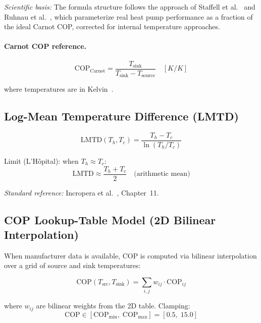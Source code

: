 \documentclass[a4paper,12pt]{article}
\newcommand{\COP}{\mathrm{COP}}
\newcommand{\LMTD}{\mathrm{LMTD}}
\begin{document}
\noindent\textit{Scientific basis:} The formula structure follows the approach of
Staffell et al.~\cite{Staffell2012} and Ruhnau et al.~\cite{Ruhnau2019}, which
parameterize real heat pump performance as a fraction of the ideal Carnot COP,
corrected for internal temperature approaches.

\paragraph{Carnot COP reference.}

\begin{equation}
  \COP_{\text{Carnot}}
  = \frac{T_{\text{sink}}}{T_{\text{sink}} - T_{\text{source}}}
  \quad [K/K]
  \label{eq:cop-carnot}
\end{equation}

where temperatures are in Kelvin~\cite{Cengel2018}.

\subsection{Log-Mean Temperature Difference (LMTD)}

\begin{equation}
  \LMTD(T_h, T_c)
  = \frac{T_h - T_c}{\ln(T_h / T_c)}
  \tag{COP-2}
  \label{eq:lmtd}
\end{equation}

\noindent Limit (L'H\^{o}pital): when $T_h \approx T_c$:
\[
  \LMTD \approx \frac{T_h + T_c}{2} \quad \text{(arithmetic mean)}
\]

\noindent\textit{Standard reference:} Incropera et al.~\cite{Incropera2017}, Chapter~11.

\subsection{COP Lookup-Table Model (2D Bilinear Interpolation)}

When manufacturer data is available, COP is computed via bilinear interpolation over a
grid of source and sink temperatures:

\begin{equation}
  \COP(T_{\text{src}}, T_{\text{sink}})
  = \sum_{i,j} w_{ij} \cdot \COP_{ij}
  \label{eq:cop-lookup}
\end{equation}

where $w_{ij}$ are bilinear weights from the 2D table. Clamping:
\[
  \COP \in [\COP_{\min},\; \COP_{\max}] = [0.5,\; 15.0]
\]
\end{document}
